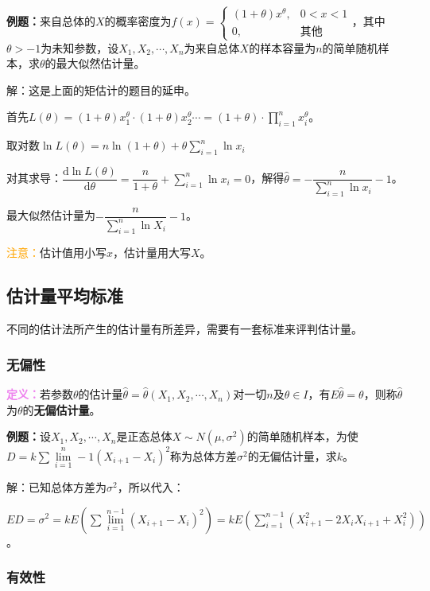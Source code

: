 \documentclass[UTF8, 12pt]{ctexart}
\begin{document}
\textbf{例题：}来自总体的$X$的概率密度为$f(x)=\left\{\begin{array}{ll}
    (1+\theta)x^\theta, & 0<x<1 \\
    0, & \text{其他}
\end{array}\right.$，其中$\theta>-1$为未知参数，设$X_1,X_2,\cdots,X_n$为来自总体$X$的样本容量为$n$的简单随机样本，求$\theta$的最大似然估计量。

解：这是上面的矩估计的题目的延申。

首先$L(\theta)=(1+\theta)x_1^\theta\cdot(1+\theta)x_2^\theta\cdots=(1+\theta)\cdot\prod\limits_{i=1}^nx_i^\theta$。

取对数$\ln L(\theta)=n\ln(1+\theta)+\theta\sum\limits_{i=1}^n\ln x_i$

对其求导：$\dfrac{\textrm{d}\ln L(\theta)}{\textrm{d}\theta}=\dfrac{n}{1+\theta}+\sum\limits_{i=1}^n\ln x_i=0$，解得$\hat{\theta}=-\dfrac{n}{\sum\limits_{i=1}^n\ln x_i}-1$。

最大似然估计量为$-\dfrac{n}{\sum\limits_{i=1}^n\ln X_i}-1$。

\textcolor{orange}{注意：}估计值用小写$x$，估计量用大写$X$。

\subsection{估计量平均标准}

不同的估计法所产生的估计量有所差异，需要有一套标准来评判估计量。

\subsubsection{无偏性}

\textcolor{violet}{\textbf{定义：}}若参数$\theta$的估计量$\hat{\theta}=\hat{\theta}(X_1,X_2,\cdots,X_n)$对一切$n$及$\theta\in I$，有$E\hat{\theta}=\theta$，则称$\hat{\theta}$为$\theta$的\textbf{无偏估计量}。

\textbf{例题：}设$X_1,X_2,\cdots,X_n$是正态总体$X\sim N(\mu,\sigma^2)$的简单随机样本，为使$D=k\sum\lim\limits_{i=1}^n-1(X_{i+1}-X_i)^2$称为总体方差$\sigma^2$的无偏估计量，求$k$。

解：已知总体方差为$\sigma^2$，所以代入：

$ED=\sigma^2=kE(\sum\lim\limits_{i=1}^{n-1}(X_{i+1}-X_i)^2)=kE(\sum\limits_{i=1}^{n-1}(X_{i+1}^2-2X_iX_{i+1}+X_i^2))$。

\subsubsection{有效性}
\end{document}
